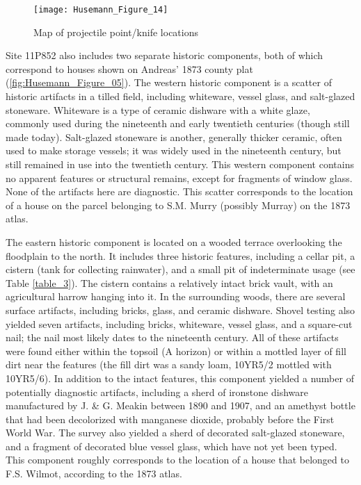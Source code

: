 \begin{figure}[!htb]
	\texttt{[image: Husemann\_Figure\_14]}
	\caption{Map of projectile point/knife locations
	}
	\label{fig:Husemann_Figure_14}
\end{figure}


Site 11P852 also includes two separate historic components, both of which correspond to houses shown on Andreas’ 1873 county plat (\cref{fig:Husemann_Figure_05}). The western historic component is a scatter of historic artifacts in a tilled field, including whiteware, vessel glass, and salt-glazed stoneware. Whiteware is a type of ceramic dishware with a white glaze, commonly used during the nineteenth and early twentieth centuries (though still made today). Salt-glazed stoneware is another, generally thicker ceramic, often used to make storage vessels; it was widely used in the nineteenth century, but still remained in use into the twentieth century. This western component contains no apparent features or structural remains, except for fragments of window glass. None of the artifacts here are diagnostic. This scatter corresponds to the location of a house on the parcel belonging to S.M. Murry (possibly Murray) on the 1873 atlas.

The eastern historic component is located on a wooded terrace overlooking the floodplain to the north. It includes three historic features, including a cellar pit, a cistern (tank for collecting rainwater), and a small pit of indeterminate usage (see Table \ref{table_3}).
The cistern contains a relatively intact brick vault, with an agricultural harrow hanging into it. In the surrounding woods, there are several surface artifacts, including bricks, glass, and ceramic dishware. Shovel testing also yielded seven artifacts, including bricks, whiteware, vessel glass, and a square-cut nail; the nail most likely dates to the nineteenth century. All of these artifacts were found either within the topsoil (A horizon) or within a mottled layer of fill dirt near the features (the fill dirt was a sandy loam, 10YR5/2 mottled with 10YR5/6). In addition to the intact features, this component yielded a number of potentially diagnostic artifacts, including a sherd of ironstone dishware manufactured by J. \& G. Meakin between 1890 and 1907, and an amethyst bottle that had been decolorized with manganese dioxide, probably before the First World War. The survey also yielded a sherd of decorated salt-glazed stoneware, and a fragment of decorated blue vessel glass, which have not yet been typed. This component roughly corresponds to the location of a house that belonged to F.S. Wilmot, according to the 1873 atlas.

